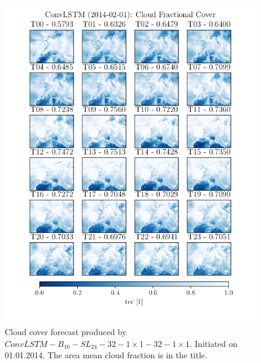 \begin{figure}[ht]
    \centering
    \includegraphics{python_figs/timelapse_convlstm_1x1_24hrs_from_2014-02-01.png}
    \caption{Cloud cover forecast produced by $ConvLSTM-B_{10}-SL_{24}-32-1\times1-32-1\times1$. Initiated on 01.01.2014. The area mean  cloud fraction is in the title.}
    \label{fig:timelapse_1x1}
\end{figure}
\cleardoublepage
